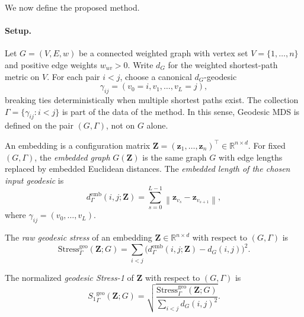 \documentclass[twoside,11pt]{article}
\newcommand{\R}{\mathbb{R}}
\newcommand{\bz}{\mathbf{z}}
\newcommand{\bZ}{\mathbf{Z}}
\newcommand{\norm}[1]{\left\|#1\right\|}
\newcommand{\demb}{d^{\mathrm{emb}}}
\newcommand{\Stress}{\mathrm{Stress}}
\newcommand{\StressOne}{S_1}
\begin{document}
We now define the proposed method.

\paragraph{Setup.}
Let $G = (V,E,w)$ be a connected weighted graph with vertex set
$V = \{1,\ldots,n\}$ and positive edge weights $w_{uv} > 0$.  Write
$d_G$ for the weighted shortest-path metric on $V$.  For each pair
$i < j$, choose a canonical $d_G$-geodesic
\begin{equation}
  \gamma_{ij} = (v_0 = i, v_1, \ldots, v_L = j),
  \label{eq:canonical_geodesic}
\end{equation}
breaking ties deterministically when multiple shortest paths exist.  The
collection $\Gamma = \{\gamma_{ij} : i < j\}$ is part of the data of the
method.  In this sense, Geodesic MDS is defined on the pair $(G,\Gamma)$,
not on $G$ alone.

An embedding is a configuration matrix $\bZ = (\bz_1, \ldots, \bz_n)^\top
\in \R^{n \times d}$.  For fixed $(G,\Gamma)$, the \emph{embedded graph}
$G(\bZ)$ is the same graph $G$ with edge lengths replaced by embedded
Euclidean distances.  The \emph{embedded length of the chosen input
geodesic} is
\begin{equation}
  \demb_{\Gamma}(i,j;\bZ)
  = \sum_{s=0}^{L-1} \norm{\bz_{v_s} - \bz_{v_{s+1}}},
  \label{eq:emb_geodesic}
\end{equation}
where $\gamma_{ij} = (v_0, \ldots, v_L)$.

\begin{definition}
  \label{def:raw_geodesic_stress}
  The \emph{raw geodesic stress} of an embedding $\bZ \in \R^{n \times d}$
  with respect to $(G,\Gamma)$ is
  \begin{equation}
    \Stress^{\mathrm{geo}}_{\Gamma}(\bZ; G)
    = \sum_{i < j}
      \bigl(\demb_{\Gamma}(i,j;\bZ) - d_G(i,j)\bigr)^2.
    \label{eq:raw_geo_stress}
  \end{equation}
\end{definition}

\begin{definition}
  \label{def:geodesic_stress}
  The normalized \emph{geodesic Stress-1} of $\bZ$ with respect to
  $(G,\Gamma)$ is
  \begin{equation}
    {\StressOne}_{\Gamma}^{\mathrm{geo}}(\bZ; G)
    = \sqrt{
        \frac{\Stress^{\mathrm{geo}}_{\Gamma}(\bZ; G)}
             {\displaystyle\sum_{i < j} d_G(i,j)^2}
      }.
    \label{eq:geo_stress}
  \end{equation}
\end{definition}
\end{document}
